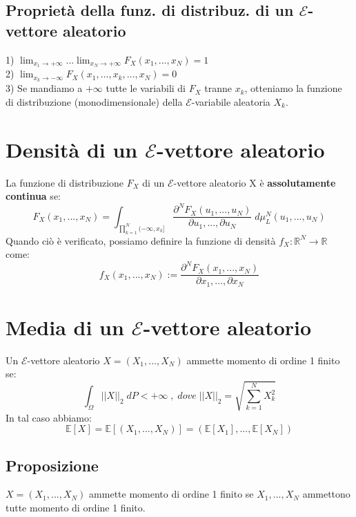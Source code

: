 \documentclass{article}
\begin{document}
\subsection*{Proprietà della funz. di distribuz. di un $\mathcal{E}$-vettore aleatorio}
1) $\lim_{x_{1}\to +\infty}...\lim_{x_{N}\to +\infty}F_{X}(x_{1},..., x_{N}) = 1$\\
2) $\lim_{x_{k}\to -\infty}F_{X}(x_{1},..., x_{k},..., x_{N}) = 0$\\
3) Se mandiamo a $+\infty$ tutte le variabili di $F_{X}$ tranne $x_{k}$, otteniamo la funzione di distribuzione (monodimensionale) della $\mathcal{E}$-variabile aleatoria $X_{k}$.

\section*{Densità di un $\mathcal{E}$-vettore aleatorio}
La funzione di distribuzione $F_{X}$ di un $\mathcal{E}$-vettore aleatorio X è \textbf{assolutamente continua} se:
\[ F_{X}(x_{1},..., x_{N}) = \int_{\prod_{k=1}^{N}(-\infty,x_{k}]}^{}\frac{\partial^{N}F_{X}(u_{1},..., u_{N})}{\partial u_{1},...,\partial u_{N}} \; d\mu_{L}^{N}(u_{1},..., u_{N}) \]
Quando ciò è verificato, possiamo definire la funzione di densità $f_{X}: \mathbb{R}^{N} \to \mathbb{R}$ come:
\[ f_{X}(x_{1},..., x_{N}) := \frac{\partial^{N}F_{X}(x_{1},..., x_{N})}{\partial x_{1},...,\partial x_{N}} \]

\section*{Media di un $\mathcal{E}$-vettore aleatorio}
Un $\mathcal{E}$-vettore aleatorio $X = (X_{1},...,X_{N})$ ammette momento di ordine 1 finito se:
\[ \int_{\Omega}^{}||X||_{2} \; dP < +\infty \; , \; dove \; ||X||_{2} = \sqrt{\sum_{k=1}^{N}X_{k}^{2}} \]
In tal caso abbiamo:
\[ \mathbb{E}[X] = \mathbb{E}[(X_{1},..., X_{N})] = (\mathbb{E}[X_{1}],..., \mathbb{E}[X_{N}]) \]

\subsection*{Proposizione}
$X = (X_{1},...,X_{N})$ ammette momento di ordine 1 finito se $X_{1},..., X_{N}$ ammettono tutte momento di ordine 1 finito.
\end{document}
